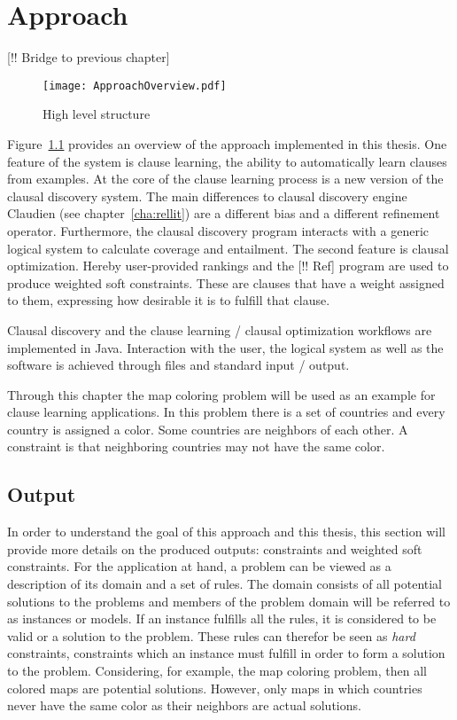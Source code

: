 \chapter{Approach}
\label{cha:meth}

[!! Bridge to previous chapter]

\begin{figure}

	\caption{High level structure}
	\centering
		\texttt{[image: ApproachOverview.pdf]}
	\label{fig:high_level_structure}

\end{figure}

Figure~\ref{fig:high_level_structure} provides an overview of the approach implemented in this thesis.
One feature of the system is clause learning, the ability to automatically learn clauses from examples.
At the core of the clause learning process is a new version of the clausal discovery system.
The main differences to clausal discovery engine Claudien (see chapter~\ref{cha:rellit}) are a different bias and a different refinement operator.
Furthermore, the clausal discovery program interacts with a generic logical system to calculate coverage and entailment.
The second feature is clausal optimization.
Hereby user-provided rankings and the \svm{} [!! Ref] program are used to produce weighted soft constraints.
These are clauses that have a weight assigned to them, expressing how desirable it is to fulfill that clause.

Clausal discovery and the clause learning / clausal optimization workflows are implemented in Java.
Interaction with the user, the logical system as well as the \svm{} software is achieved through files and standard input / output.

Through this chapter the map coloring problem will be used as an example for clause learning applications.
In this problem there is a set of countries and every country is assigned a color.
Some countries are neighbors of each other.
A constraint is that neighboring countries may not have the same color.

\section{Output}
In order to understand the goal of this approach and this thesis, this section will provide more details on the produced outputs: constraints and weighted soft constraints.
For the application at hand, a problem can be viewed as a description of its domain and a set of rules.
The domain consists of all potential solutions to the problems and members of the problem domain will be referred to as instances or models.
If an instance fulfills all the rules, it is considered to be valid or a solution to the problem.
These rules can therefor be seen as \textit{hard} constraints, constraints which an instance must fulfill in order to form a solution to the problem.
Considering, for example, the map coloring problem, then all colored maps are potential solutions.
However, only maps in which countries never have the same color as their neighbors are actual solutions.

